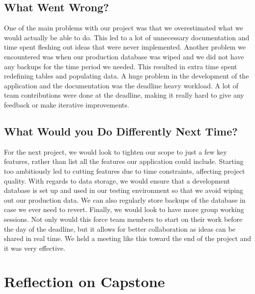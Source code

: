 \documentclass{article}
\begin{document}
\subsection{What Went Wrong?}
One of the main problems with our project was that we overestimated what we would actually be able to do. This led to a lot of unnecessary documentation and time spent fleshing out ideas that were never implemented. Another problem we encountered was when our production database was wiped and we did not have any backups for the time period we needed. This resulted in extra time spent redefining tables and populating data. A huge problem in the development of the application and the documentation was the deadline heavy workload. A lot of team contributions were done at the deadline, making it really hard to give any feedback or make iterative improvements.

\subsection{What Would you Do Differently Next Time?}
For the next project, we would look to tighten our scope to just a few key features, rather than list all the features our application could include. Starting too ambitiously led to cutting features due to time constraints, affecting project quality. With regards to data storage, we would ensure that a development database is set up and used in our testing environment so that we avoid wiping out our production data. We can also regularly store backups of the database in case we ever need to revert. Finally, we would look to have more group working sessions. Not only would this force team members to start on their work before the day of the deadline, but it allows for better collaboration as ideas can be shared in real time. We held a meeting like this toward the end of the project and it was very effective.

\section{Reflection on Capstone}
\end{document}
